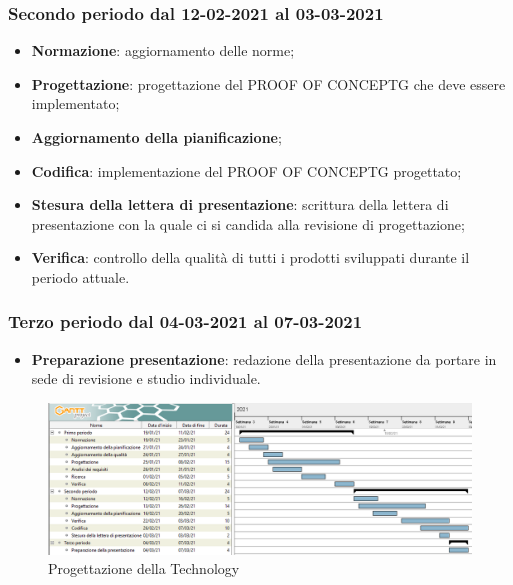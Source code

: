 	\subsubsection{Secondo periodo dal 12-02-2021 al 03-03-2021}
	\begin{itemize}
	\item \textbf{Normazione}: aggiornamento delle norme;
	\item \textbf{Progettazione}: progettazione del PROOF OF CONCEPTG che deve essere implementato;
	\item \textbf{Aggiornamento della pianificazione};
	\item \textbf{Codifica}: implementazione del PROOF OF CONCEPTG progettato;
	\item \textbf{Stesura della lettera di presentazione}: scrittura della lettera di presentazione con la quale ci
	si candida alla revisione di progettazione;
	\item \textbf{Verifica}: controllo della qualità di tutti i prodotti sviluppati durante il periodo attuale.
	\end{itemize}	
	
	\subsubsection{Terzo periodo dal 04-03-2021 al 07-03-2021}
	\begin{itemize}
	\item \textbf{Preparazione presentazione}: redazione della presentazione da portare in sede di revisione e
	studio individuale.
	\end{itemize}

	\newpage
	
	\begin{landscape}
		\begin{figure}[h!]
			\includegraphics[width=24cm]{images/3_Progettazione_della_Technology.png}
			\caption{Progettazione della Technology}
		\end{figure}
	\end{landscape}
	
